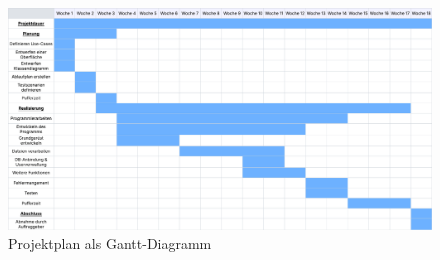 \begin{figure}[H]
    \centering
    \includegraphics[width=\textwidth]{src/gantt_diagramm.pdf} 
    \caption{Projektplan als Gantt-Diagramm}
\end{figure}